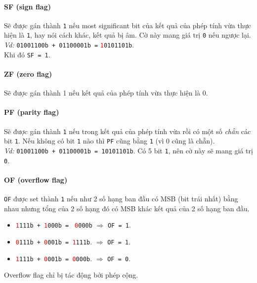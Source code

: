 \documentclass[12pt]{report}
\newcommand{\code}[1]{\texttt{#1}}
\newcommand{\codeh}[1]{\textcolor{red}{\code{#1}}}
\begin{document}
\paragraph{SF (sign flag)}
Sẽ được gán thành \code 1 nếu most significant bit của kết quả của phép tính vừa thực hiện là \code 1, hay nói cách khác, kết quả bị âm. Cờ này mang giá trị \code 0 nếu ngược lại.\break
\textit{Vd:} \code{01001100b + 01100001b =} \textcolor{red}{\code 1}\code{0101101b}.\\ 
Khi đó \code{SF = 1}.
\bigskip

\paragraph{ZF (zero flag)}
Sẽ được gán thành 1 nếu kết quả của phép tính vừa thực hiện là 0.
\bigskip 

\paragraph{PF (parity flag)}
Sẽ được gán thành \code 1 nếu trong kết quả của phép tính vừa rồi có một số \textit{chẵn} các bit \code 1. Nếu không có bit \code 1 nào thì \code{PF} cũng bằng \code 1 (vì 0 cũng là chẵn).\\
\textit{Vd:} \code{01001100b + 01100001b = 10101101b}. Có 5 bit \code 1, nên cờ này sẽ mang giá trị \code 0.

\paragraph{OF (overflow flag)}
\code{OF} được set thành \code 1 nếu như 2 số hạng ban đầu có MSB (bit trái nhất) bằng nhau nhưng tổng của 2 số hạng đó có MSB khác kết quả của 2 số hạng ban đầu.
\begin{itemize}
    \item \codeh{1}\code{111b + }\codeh{1}\code{000b = } \codeh{0}\code{000b} $\Rightarrow$ \code{OF = 1}.
    \item \codeh{0}\code{111b + }\codeh{0}\code{001b = }\codeh{1}\code{111b}. $\Rightarrow$ \code{OF = 1}.
    \item \codeh{1}\code{111b + }\codeh{0}\code{001b = }\codeh{0}\code{000b}. $\Rightarrow$ \code{OF = 0}.
\end{itemize}
Overflow flag chỉ bị tác động bởi phép cộng.
\end{document}
